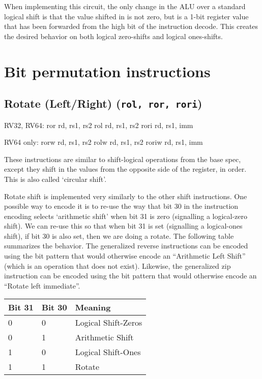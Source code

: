 When implementing this circuit, the only change in the ALU over a
standard logical shift is that the value shifted in is not zero, but is
a 1-bit register value that has been forwarded from the high bit of the
instruction decode. This creates the desired behavior on both logical
zero-shifts and logical ones-shifts.


\section{Bit permutation instructions}


\subsection{Rotate (Left/Right) (\texttt{rol,\ ror,\ rori})}

\begin{rvb}
  RV32, RV64:
    ror  rd, rs1, rs2
    rol  rd, rs1, rs2
    rori rd, rs1, imm

  RV64 only:
    rorw  rd, rs1, rs2
    rolw  rd, rs1, rs2
    roriw rd, rs1, imm
\end{rvb}

These instructions are similar to shift-logical operations from the base
spec, except they shift in the values from the opposite side of the
register, in order. This is also called `circular shift'.



Rotate shift is implemented very similarly to the other shift
instructions. One possible way to encode it is to re-use the way that
bit 30 in the instruction encoding selects `arithmetic shift' when bit
31 is zero (signalling a logical-zero shift). We can re-use this so that
when bit 31 is set (signalling a logical-ones shift), if bit 30 is also
set, then we are doing a rotate. The following table summarizes the
behavior. The generalized reverse instructions can be encoded using the
bit pattern that would otherwise encode an ``Arithmetic Left Shift''
(which is an operation that does not exist). Likewise, the generalized zip
instruction can be encoded using the bit pattern that would otherwise
encode an ``Rotate left immediate''.

\begin{center}
\begin{tabular}{lll}
Bit 31 & Bit 30 & Meaning \\
\hline
0 & 0 & Logical Shift-Zeros \\
0 & 1 & Arithmetic Shift \\
1 & 0 & Logical Shift-Ones \\
1 & 1 & Rotate \\
\end{tabular}
\end{center}

